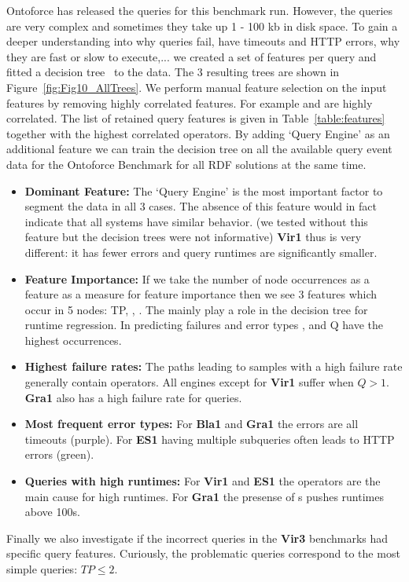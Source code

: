 Ontoforce has released the queries for this benchmark run. However, the queries are very complex and sometimes they take up 1 - 100 kb in disk space. To gain a deeper understanding into why queries fail, have timeouts and HTTP errors, why they are fast or slow to execute,... we created a set of features per query and fitted a decision tree~\cite{sklearndtree} to the data. The 3 resulting trees are shown in Figure~\ref{fig:Fig10_AllTrees}. We perform manual feature selection on the input features by removing highly correlated features. For example  and  are highly correlated. The list of retained query features is given in Table~\ref{table:features} together with the highest correlated operators.
By adding `Query Engine' as an additional feature we can train the decision tree on all the available query event data for the Ontoforce Benchmark for all RDF solutions at the same time. 
\begin{itemize}
	\item \textbf{Dominant Feature:} The `Query Engine' is the most important factor to segment the data in all 3 cases. The absence of this feature would in fact indicate that all systems have similar behavior. (we tested without this feature but the decision trees were not informative) \textbf{Vir1} thus is very different: it has fewer errors and query runtimes are significantly smaller.
	\item \textbf{Feature Importance:} If we take the number of node occurrences as a feature as a measure for feature importance then we see 3 features which occur in 5 nodes: TP, , . The  mainly play a role in the decision tree for runtime regression. In predicting failures and error types ,  and Q have the highest occurrences.
	\item \textbf{Highest failure rates:} The paths leading to samples with a high failure rate generally contain  operators. All engines except for \textbf{Vir1} suffer when $Q > 1$. \textbf{Gra1} also has a high failure rate for  queries.
	\item \textbf{Most frequent error types:} For \textbf{Bla1} and \textbf{Gra1} the errors are all timeouts (purple). For \textbf{ES1} having multiple subqueries often leads to HTTP errors (green). 
	\item \textbf{Queries with high runtimes:} For \textbf{Vir1} and \textbf{ES1} the  operators are the main cause for high runtimes. For \textbf{Gra1} the presense of s pushes runtimes above 100s. 
\end{itemize}

Finally we also investigate if the incorrect queries in the \textbf{Vir3} benchmarks had specific query features. Curiously, the problematic queries correspond to the most simple queries: $TP \leq 2$.	
